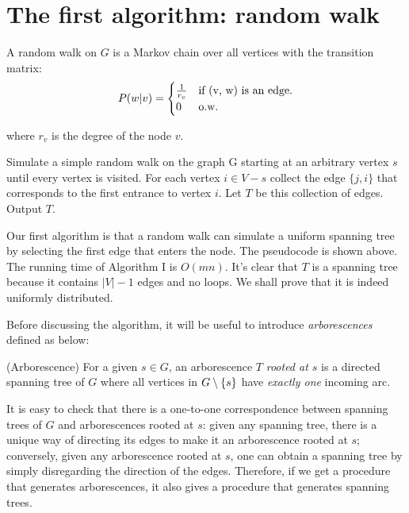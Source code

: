 \section{The first algorithm: random walk}

A random walk on $G$ is a Markov chain over all vertices with the transition matrix:
\begin{equation*}
    P(w|v) = \begin{cases} 
      \frac{1}{r_v} & \text{if } $(v, w)$ \text{ is an edge.} \\
      0 & \text{o.w.}
   \end{cases}
\end{equation*}

where $r_v$ is the degree of the node $v$.

\begin{algorithm}
\caption*{$\textsc{Algorithm I \cite{aldous1990random} \cite{broder1989generating}}$}
\begin{algorithmic}
    \State  Simulate a simple random walk on the graph G starting at an arbitrary vertex $s$ until every vertex is visited. For each vertex $i \in V - s$ collect the edge $\{j, i\}$ that corresponds to the first entrance to vertex $i$. Let $T$ be this collection of edges. Output $T$.
\end{algorithmic}
\end{algorithm}
Our first algorithm is that a random walk can simulate a uniform spanning tree by selecting the first edge that enters the node. The pseudocode is shown above. The running time of Algorithm I is $O(mn)$. It's clear that $T$ is a spanning tree because it contains $|V|-1$ edges and no loops. We shall prove that it is indeed uniformly distributed. 

Before discussing the algorithm, it will be useful to introduce \emph{arborescences} defined as below:
\begin{definition}{(Arborescence)}    
    For a given $s \in G$, an arborescence $T$ \emph{rooted at $s$} is a directed spanning tree of $G$ where all vertices in $G \setminus \set{s}$ have \emph{exactly one} incoming arc.
\end{definition}

It is easy to check that there is a one-to-one correspondence between spanning trees of $G$ and arborescences rooted at $s$: given any spanning tree, there is a unique way of directing its edges to make it an arborescence rooted at $s$; conversely, given any arborescence rooted at $s$, one can obtain a spanning tree by simply disregarding the direction of the edges.
Therefore, if we get a procedure that generates arborescences, it also gives a procedure that generates spanning trees. 

